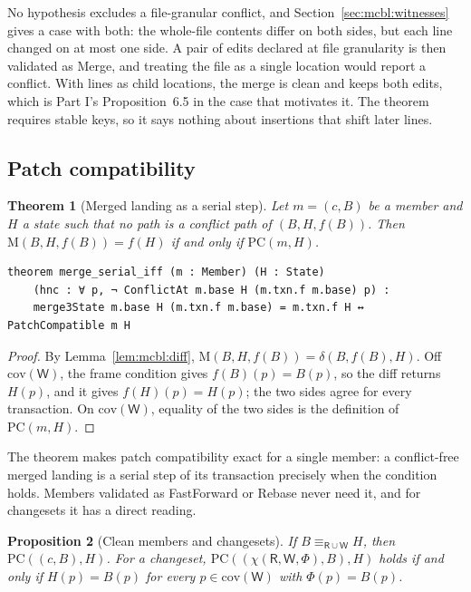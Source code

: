 \documentclass[11pt,letterpaper]{article}
\newtheorem{theorem}{Theorem}[section]
\newtheorem{proposition}[theorem]{Proposition}
\theoremstyle{definition}
\theoremstyle{remark}
\newcommand{\R}{\mathsf{R}}
\newcommand{\W}{\mathsf{W}}
\newcommand{\op}[1]{\mathrm{#1}}
\newcommand{\covd}{\op{cov}}
\newcommand{\mrg}{\op{M}}
\newcommand{\PC}{\op{PC}}
\begin{document}
No hypothesis excludes a file-granular conflict, and Section~\ref{sec:mcbl:witnesses} gives a case with both: the whole-file contents differ on both sides, but each line changed on at most one side. A pair of edits declared at file granularity is then validated as Merge, and treating the file as a single location would report a conflict. With lines as child locations, the merge is clean and keeps both edits, which is Part I's Proposition~6.5 in the case that motivates it. The theorem requires stable keys, so it says nothing about insertions that shift later lines.

\subsection{Patch compatibility}

\begin{theorem}[Merged landing as a serial step]
\label{thm:mcbl:mergeiff}
Let $m=(c,B)$ be a member and $H$ a state such that no path is a conflict path of $(B,H,f(B))$. Then $\mrg(B,H,f(B))=f(H)$ if and only if $\PC(m,H)$.
\end{theorem}

\begin{lstlisting}[language=Lean,caption={The exact condition for a merged landing (\texttt{YonedaTx/Batch.lean})},label={lst:mcbl:mergeiff}]
theorem merge_serial_iff (m : Member) (H : State)
    (hnc : ∀ p, ¬ ConflictAt m.base H (m.txn.f m.base) p) :
    merge3State m.base H (m.txn.f m.base) = m.txn.f H ↔ PatchCompatible m H
\end{lstlisting}

\begin{proof}
By Lemma~\ref{lem:mcbl:diff}, $\mrg(B,H,f(B))=\delta(B,f(B),H)$. Off $\covd(\W)$, the frame condition gives $f(B)(p)=B(p)$, so the diff returns $H(p)$, and it gives $f(H)(p)=H(p)$; the two sides agree for every transaction. On $\covd(\W)$, equality of the two sides is the definition of $\PC(m,H)$.
\end{proof}

The theorem makes patch compatibility exact for a single member: a conflict-free merged landing is a serial step of its transaction precisely when the condition holds. Members validated as FastForward or Rebase never need it, and for changesets it has a direct reading.

\begin{proposition}[Clean members and changesets]
\label{prop:mcbl:pcclean}
If $B\equiv_{\R\cup\W}H$, then $\PC((c,B),H)$. For a changeset, $\PC((\chi(\R,\W,\Phi),B),H)$ holds if and only if $H(p)=B(p)$ for every $p\in\covd(\W)$ with $\Phi(p)=B(p)$.
\end{proposition}
\end{document}
